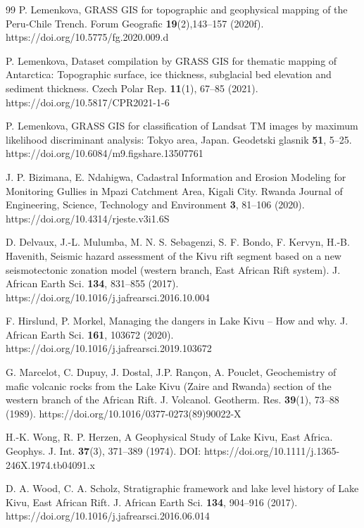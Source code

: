 \documentclass[myclassdoc,debug]{rjparticle}
\begin{document}
\begin{thebibliography}{99}
P. Lemenkova, GRASS GIS for topographic and geophysical mapping of the Peru-Chile Trench. Forum Geografic \textbf{19}(2),143--157 (2020f). https://doi.org/10.5775/fg.2020.009.d 

P. Lemenkova, Dataset compilation by GRASS GIS for thematic mapping of Antarctica: Topographic surface, ice thickness, subglacial bed elevation and sediment thickness. Czech Polar Rep. \textbf{11}(1), 67--85 (2021). https://doi.org/10.5817/CPR2021-1-6

P. Lemenkova, GRASS GIS for classification of Landsat TM images by maximum likelihood discriminant analysis: Tokyo area, Japan. Geodetski glasnik \textbf{51}, 5--25. https://doi.org/10.6084/m9.figshare.13507761 

J. P. Bizimana, E. Ndahigwa, Cadastral Information and Erosion Modeling for Monitoring Gullies in Mpazi Catchment Area, Kigali City. Rwanda Journal of Engineering, Science, Technology and Environment \textbf{3}, 81--106 (2020). https://doi.org/10.4314/rjeste.v3i1.6S

D. Delvaux, J.-L. Mulumba, M. N. S. Sebagenzi, S. F. Bondo, F. Kervyn, H.-B. Havenith, Seismic hazard assessment of the Kivu rift segment based on a new seismotectonic zonation model (western branch, East African Rift system). J. African Earth Sci. \textbf{134}, 831--855 (2017). https://doi.org/10.1016/j.jafrearsci.2016.10.004

F. Hirslund, P. Morkel, Managing the dangers in Lake Kivu – How and why. J. African Earth Sci. \textbf{161}, 103672 (2020). https://doi.org/10.1016/j.jafrearsci.2019.103672

G. Marcelot, C. Dupuy, J. Dostal, J.P. Rançon, A. Pouclet, Geochemistry of mafic volcanic rocks from the Lake Kivu (Zaire and Rwanda) section of the western branch of the African Rift. J. Volcanol. Geotherm. Res. \textbf{39}(1), 73--88 (1989). https://doi.org/10.1016/0377-0273(89)90022-X

H.-K. Wong, R. P. Herzen, A Geophysical Study of Lake Kivu, East Africa. Geophys. J. Int. \textbf{37}(3), 371--389 (1974). DOI: https://doi.org/10.1111/j.1365-246X.1974.tb04091.x

D. A. Wood, C. A. Scholz, Stratigraphic framework and lake level history of Lake Kivu, East African Rift. J. African Earth Sci. \textbf{134}, 904--916 (2017). https://doi.org/10.1016/j.jafrearsci.2016.06.014


\end{thebibliography}
\end{document}
